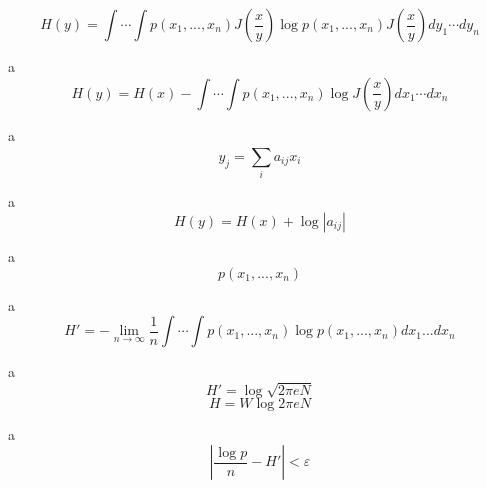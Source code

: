 \begin{equation}
H\left ( y \right )=\int \cdots \int p\left ( x_{1},...,x_{n} \right )J\left ( \frac{x}{y} \right )\log p\left ( x_{1},...,x_{n} \right )J\left ( \frac{x}{y} \right )dy_{1}\cdots dy_{n}
\end{equation}

a\\

\begin{equation}
H\left ( y \right )=H\left ( x \right )-\int \cdots \int p\left ( x_{1},...,x_{n} \right )\log J \left ( \frac{x}{y} \right )dx_{1}\cdots dx_{n}
\end{equation}

a\\

\begin{equation}
y_{j}=\sum_{i}^{\:}a_{ij}x_{i}
\end{equation}

a\\

\begin{equation}
H\left ( y \right )=H\left ( x \right )+\log\left | a_{ij} \right |
\end{equation}

a\\

\begin{equation}
p\left ( x_{1},...,x_{n}\right )
\end{equation}

a\\

\begin{equation}
{H}'=-\lim_{n\rightarrow \infty }\frac{1}{n}\int \cdots \int p\left ( x_{1},...,x_{n}\right ) \log p\left ( x_{1},...,x_{n}\right )dx_{1}...dx_{n}
\end{equation}

a\\

\begin{equation}
{H}'=\log \sqrt{2\pi eN}
\end{equation}
\begin{equation}
H=W\log 2\pi eN
\end{equation}

a\\

\begin{equation}
\left | \frac{\log p}{n} - {H}'\right |< \varepsilon 
\end{equation}

